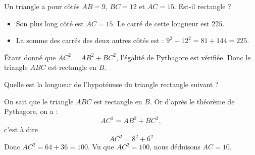 \begin{example}
    Un triangle a pour côtés \( AB=9\), \( BC=12\) et \( AC=15\). Est-il rectangle ?
    \begin{itemize}
        \item Son plus long côté est \( AC=15\). Le carré de cette longueur est \( 225\).
        \item La somme des carrés des deux autres côtés est : \( 9^2+12^2=81+144=225\).
    \end{itemize}
    Étant donné que \( AC^2=AB^2+BC^2\), l'égalité de Pythagore est vérifiée. Donc le triangle \( ABC\) est rectangle en \( B\).
\end{example}

\begin{example}
    Quelle est la longueur de l'hypoténuse du triangle rectangle suivant ?
    \begin{center}
        
    \end{center}
    On sait que le triangle \( ABC\) est rectangle en \( B\). Or d'après le théorème de Pythagore, on a :
    \begin{equation}
        AC^2=AB^2+BC^2,
    \end{equation}
    c'est à dire
    \begin{equation}
        AC^2=8^2+6^2
    \end{equation}
    Donc \( AC^2=64+36=100\). Vu que \( AC^2=100\), nous déduisons \( AC=10\).
\end{example}

